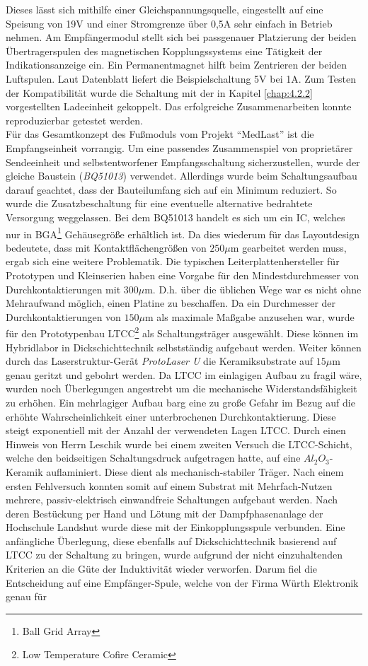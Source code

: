 \documentclass[12pt]{scrreprt} %
\begin{document}
Dieses lässt sich mithilfe einer Gleichspannungsquelle, eingestellt auf eine Speisung von 19V und einer Stromgrenze über 0,5A sehr einfach in Betrieb nehmen. Am Empfängermodul stellt sich bei passgenauer Platzierung der beiden Übertragerspulen des magnetischen Kopplungssystems eine Tätigkeit der Indikationsanzeige ein. Ein Permanentmagnet hilft beim Zentrieren der beiden Luftspulen. Laut Datenblatt \citep[vgl. S.2]{bq51013EVM-725} liefert die Beispielschaltung 5V bei 1A. Zum Testen der Kompatibilität wurde die Schaltung mit der in Kapitel \ref{chap:4.2.2} vorgestellten Ladeeinheit gekoppelt. Das erfolgreiche Zusammenarbeiten konnte reproduzierbar getestet werden.\\
Für das Gesamtkonzept des Fußmoduls vom Projekt "`MedLast"' ist die Empfangseinheit vorrangig. Um eine passendes Zusammenspiel von proprietärer Sendeeinheit und selbstentworfener Empfangsschaltung sicherzustellen, wurde der gleiche Baustein (\textit{BQ51013}) verwendet. Allerdings wurde beim Schaltungsaufbau darauf geachtet, dass der Bauteilumfang sich auf ein Minimum reduziert. So wurde die Zusatzbeschaltung für eine eventuelle alternative bedrahtete Versorgung weggelassen. Bei dem BQ51013 handelt es sich um ein IC, welches nur in BGA\footnote{Ball Grid Array} Gehäusegröße erhältlich ist. Da dies wiederum für das Layoutdesign bedeutete, dass mit Kontaktflächengrößen von $250\mu$m gearbeitet werden muss, ergab sich eine weitere Problematik. Die typischen Leiterplattenhersteller für Prototypen und Kleinserien haben eine Vorgabe für den Mindestdurchmesser von Durchkontaktierungen mit $300\mu$m. D.h. über die üblichen Wege war es nicht ohne Mehraufwand möglich, einen Platine zu beschaffen. Da ein Durchmesser der Durchkontaktierungen von $150\mu$m als maximale Maßgabe anzusehen war, wurde für den Prototypenbau LTCC\footnote{Low Temperature Cofire Ceramic} als Schaltungsträger ausgewählt. Diese können im Hybridlabor in Dickschichttechnik selbstständig aufgebaut werden. Weiter können durch das Laserstruktur-Gerät \textit{ProtoLaser U} die Keramiksubstrate auf $15\mu$m genau geritzt und gebohrt werden.  Da LTCC im einlagigen Aufbau zu fragil wäre, wurden noch Überlegungen angestrebt um die mechanische Widerstandsfähigkeit zu erhöhen. Ein mehrlagiger Aufbau barg eine zu große Gefahr im Bezug auf die erhöhte Wahrscheinlichkeit einer unterbrochenen Durchkontaktierung. Diese steigt exponentiell mit der Anzahl der verwendeten Lagen LTCC. Durch einen Hinweis von Herrn Leschik wurde bei einem zweiten Versuch die LTCC-Schicht, welche den beidseitigen Schaltungsdruck aufgetragen hatte, auf eine $Al_2O_3$-Keramik auflaminiert. Diese dient als mechanisch-stabiler Träger. Nach einem ersten Fehlversuch konnten somit auf einem Substrat mit Mehrfach-Nutzen mehrere, passiv-elektrisch einwandfreie Schaltungen aufgebaut werden. Nach deren Bestückung per Hand und Lötung mit der Dampfphasenanlage der Hochschule Landshut wurde diese mit der Einkopplungsspule verbunden. Eine anfängliche Überlegung, diese ebenfalls auf Dickschichttechnik basierend auf LTCC zu der Schaltung zu bringen, wurde aufgrund der nicht einzuhaltenden Kriterien an die Güte der Induktivität wieder verworfen. Darum fiel die Entscheidung auf eine Empfänger-Spule, welche von der Firma Würth Elektronik genau für 
\end{document}
